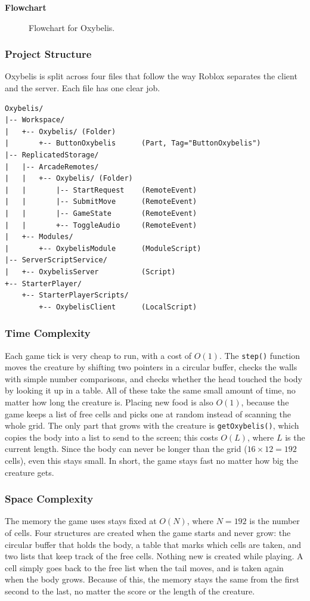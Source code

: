 \documentclass[12pt,letterpaper]{article}
\begin{document}
\textbf{Flowchart}
\begin{figure}[H]
  \centering
  
  \caption{Flowchart for Oxybelis.}
  \label{fig:oxybelis_flow}
\end{figure}

\subsubsection{Project Structure}

Oxybelis is split across four files that follow the way Roblox separates the client and the server. Each file has one clear job.

\begin{lstlisting}
Oxybelis/
|-- Workspace/
|   +-- Oxybelis/ (Folder)
|       +-- ButtonOxybelis      (Part, Tag="ButtonOxybelis")
|-- ReplicatedStorage/
|   |-- ArcadeRemotes/
|   |   +-- Oxybelis/ (Folder)
|   |       |-- StartRequest    (RemoteEvent)
|   |       |-- SubmitMove      (RemoteEvent)
|   |       |-- GameState       (RemoteEvent)
|   |       +-- ToggleAudio     (RemoteEvent)
|   +-- Modules/
|       +-- OxybelisModule      (ModuleScript)
|-- ServerScriptService/
|   +-- OxybelisServer          (Script)
+-- StarterPlayer/
    +-- StarterPlayerScripts/
        +-- OxybelisClient      (LocalScript)
\end{lstlisting}


\subsubsection{Time Complexity}
Each game tick is very cheap to run, with a cost of $O(1)$. The \texttt{step()} function moves the creature by shifting two pointers in a circular buffer, checks the walls with simple number comparisons, and checks whether the head touched the body by looking it up in a table. All of these take the same small amount of time, no matter how long the creature is. Placing new food is also $O(1)$, because the game keeps a list of free cells and picks one at random instead of scanning the whole grid. The only part that grows with the creature is \texttt{getOxybelis()}, which copies the body into a list to send to the screen; this costs $O(L)$, where $L$ is the current length. Since the body can never be longer than the grid ($16 \times 12 = 192$ cells), even this stays small. In short, the game stays fast no matter how big the creature gets.

\subsubsection{Space Complexity}
The memory the game uses stays fixed at $O(N)$, where $N = 192$ is the number of cells. Four structures are created when the game starts and never grow: the circular buffer that holds the body, a table that marks which cells are taken, and two lists that keep track of the free cells. Nothing new is created while playing. A cell simply goes back to the free list when the tail moves, and is taken again when the body grows. Because of this, the memory stays the same from the first second to the last, no matter the score or the length of the creature.
\end{document}
